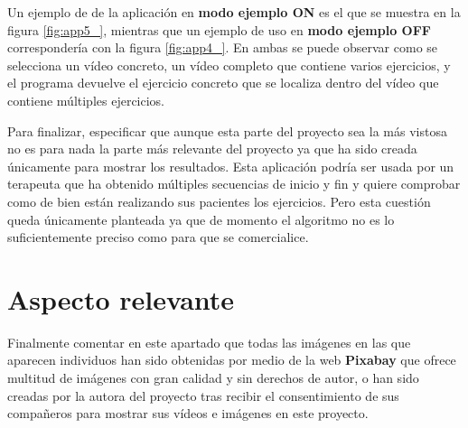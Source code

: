 Un ejemplo de de la aplicación en \textbf{modo ejemplo ON} es el que se muestra en la figura \ref{fig:app5_}, mientras que un ejemplo de uso en \textbf{modo ejemplo OFF} correspondería con la figura \ref{fig:app4_}. En ambas se puede observar como se selecciona un vídeo concreto, un vídeo completo que contiene varios ejercicios, y el programa devuelve el ejercicio concreto que se localiza dentro del vídeo que contiene múltiples ejercicios.

Para finalizar, especificar que aunque esta parte del proyecto sea la más vistosa no es para nada la parte más relevante del proyecto ya que ha sido creada únicamente para mostrar los resultados. Esta aplicación podría ser usada por un terapeuta que ha obtenido múltiples secuencias de inicio y fin y quiere comprobar como de bien están realizando sus pacientes los ejercicios. Pero esta cuestión queda únicamente planteada ya que de momento el algoritmo no es lo suficientemente preciso como para que se comercialice. 

\section{Aspecto relevante}

Finalmente comentar en este apartado que todas las imágenes en las que aparecen individuos han sido obtenidas por medio de la web \textbf{Pixabay} que ofrece multitud de imágenes con gran calidad y sin derechos de autor, o han sido creadas por la autora del proyecto tras recibir el consentimiento de sus compañeros para mostrar sus vídeos e imágenes en este proyecto. 

